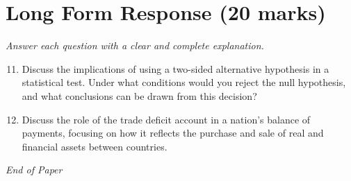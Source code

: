 \documentclass[12pt]{article}
\begin{document}
\section*{Long Form Response (20 marks)}
\textit{Answer each question with a clear and complete explanation.}
\begin{enumerate}[label=\arabic*.]
\setcounter{enumi}{10}
\item Discuss the implications of using a two-sided alternative hypothesis in a statistical
test. Under what conditions would you reject the null hypothesis, and what conclusions can
be drawn from this decision?
\item Discuss the role of the trade deficit account in a nation's balance of payments, focusing
on how it reflects the purchase and sale of real and financial assets between countries.
\end{enumerate}

\vfill
\noindent\textit{End of Paper}
\end{document}
